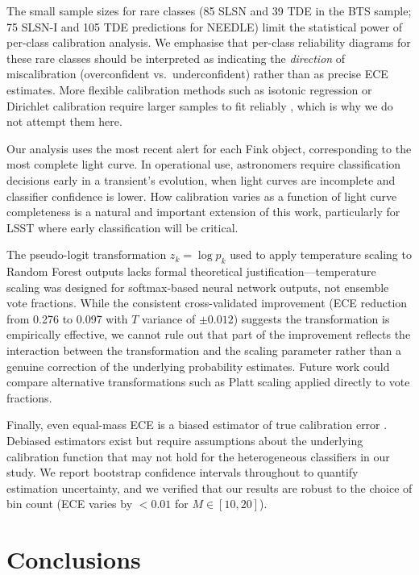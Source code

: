 \documentclass[twocolumn]{aastex631}
\begin{document}
The small sample sizes for rare classes (85 SLSN and 39 TDE in the BTS sample; 75 SLSN-I and 105 TDE predictions for NEEDLE) limit the statistical power of per-class calibration analysis. We emphasise that per-class reliability diagrams for these rare classes should be interpreted as indicating the \emph{direction} of miscalibration (overconfident vs.\ underconfident) rather than as precise ECE estimates. More flexible calibration methods such as isotonic regression or Dirichlet calibration require larger samples to fit reliably \citep{vaicenavicius2019}, which is why we do not attempt them here.

Our analysis uses the most recent alert for each Fink object, corresponding to the most complete light curve. In operational use, astronomers require classification decisions early in a transient's evolution, when light curves are incomplete and classifier confidence is lower. How calibration varies as a function of light curve completeness is a natural and important extension of this work, particularly for LSST where early classification will be critical.

The pseudo-logit transformation $z_k = \log p_k$ used to apply temperature scaling to Random Forest outputs lacks formal theoretical justification---temperature scaling was designed for softmax-based neural network outputs, not ensemble vote fractions. While the consistent cross-validated improvement (ECE reduction from 0.276 to 0.097 with $T$ variance of $\pm 0.012$) suggests the transformation is empirically effective, we cannot rule out that part of the improvement reflects the interaction between the transformation and the scaling parameter rather than a genuine correction of the underlying probability estimates. Future work could compare alternative transformations such as Platt scaling applied directly to vote fractions.

Finally, even equal-mass ECE is a biased estimator of true calibration error \citep{roelofs2022}. Debiased estimators exist but require assumptions about the underlying calibration function that may not hold for the heterogeneous classifiers in our study. We report bootstrap confidence intervals throughout to quantify estimation uncertainty, and we verified that our results are robust to the choice of bin count (ECE varies by $< 0.01$ for $M \in [10, 20]$).


\section{Conclusions} \label{sec:conclusions}
\end{document}
